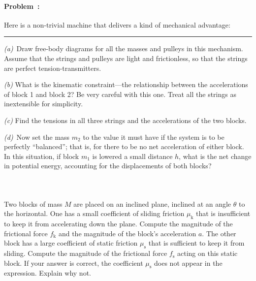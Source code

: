 \documentclass[12pt]{article}
\newcounter{problem}
\begin{document}
\paragraph{Problem~\theproblem:}%
Here is a non-trivial machine that delivers a kind of mechanical
advantage:
\\ \rule{0.33\textwidth}{0pt}

\textsl{(a)}~Draw free-body diagrams for all the masses and pulleys in
this mechanism. Assume that the strings and pulleys are light and
frictionless, so that the strings are perfect tension-transmitters.

\textsl{(b)} What is the kinematic constraint---the relationship
between the accelerations of block 1 and block 2? Be very careful with
this one. Treat all the strings as inextensible for simplicity.

\textsl{(c)} Find the tensions in all three strings and the
accelerations of the two blocks.

\textsl{(d)}~Now set the mass $m_2$ to the value it must have if the
system is to be perfectly ``balanced''; that is, for there to be no
net acceleration of either block.  In this situation, if block $m_1$
is lowered a small distance $h$, what is the net change in potential
energy, accounting for the displacements of both blocks?

\paragraph{\problemname~\theproblem}

Two blocks of mass $M$ are placed on an inclined plane, inclined at an
angle $\theta$ to the horizontal.  One has a small coefficient of
sliding friction $\mu_\mathrm{k}$ that is insufficient to keep it from
accelerating down the plane.  Compute the magnitude of the frictional
force $f_\mathrm{k}$ and the magnitude of the block's acceleration
$a$.  The other block has a large coefficient of static friction
$\mu_\mathrm{s}$ that is sufficient to keep it from sliding.  Compute
the magnitude of the frictional force $f_\mathrm{s}$ acting on this
static block.  If your answer is correct, the coefficient
$\mu_\mathrm{s}$ does not appear in the expression.  Explain why not.

\paragraph{\problemname~\theproblem}
\end{document}
